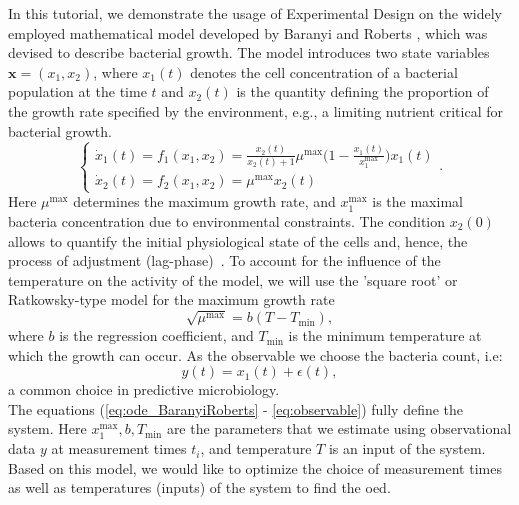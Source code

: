 \documentclass[10pt,A4paper]{article}
\newcommand{\mbx}{\mathbf{x}}
\begin{document}
In this tutorial, we demonstrate the usage of Experimental Design on the widely employed mathematical model developed by Baranyi and Roberts \cite{baranyiDynamicApproach1994}, which was devised to describe bacterial growth.
The model introduces two state variables $\mbx = (x_1, x_2)$, where $x_1(t)$ denotes the cell concentration of a bacterial population at the time $t$
and $x_2(t)$ is the quantity defining the proportion of the growth rate specified by the environment, e.g., a limiting nutrient critical for bacterial growth.
\begin{equation}
    \begin{cases}
        \dot x_1(t) = f_1(x_1, x_2) = \frac{x_2(t)}{x_2(t) + 1} \mu^\text{max} \big(1 - \frac{x_1(t)}{x_1^\text{max}}\big) x_1(t)\\
        \dot x_2(t) = f_2(x_1, x_2) = \mu^\text{max}  x_2(t)
    \end{cases}.
    \label{eq:ode_BaranyiRoberts}
\end{equation}
Here $\mu^\text{max}$ determines the maximum growth rate, and $x_1^\text{max}$ is the maximal bacteria concentration due to environmental constraints.
The condition $x_2(0)$ allows to quantify the initial physiological state of the cells and, hence, the process of adjustment (lag-phase)~\cite{grijspeerdt_estimating_1999}.
To account for the influence of the temperature on the activity of the model, we will use the 'square root' or Ratkowsky-type model for the maximum growth rate~\cite{ratkowsky_relationship_1982}
\begin{equation}
    \sqrt{\mu^\text{max}} = b (T - T_\text{min}),
    \label{eq:RatkowskyModel}
\end{equation}
where $b$ is the regression coefficient, and $T_\text{min}$ is the minimum temperature at which the growth can occur.
As the observable we choose the bacteria count, i.e:
\begin{equation}
    y(t) = x_1(t)+\epsilon(t),
    \label{eq:observable}
 \end{equation}
a common choice in predictive microbiology.\\
The equations (\ref{eq:ode_BaranyiRoberts} - \ref{eq:observable}) fully define the system.
Here $x_1^\text{max}, b, T_\text{min}$ are the parameters that we estimate using observational data $y$ at measurement times $t_i$, and temperature $T$ is an input of the system.
Based on this model, we would like to optimize the choice of measurement times as well as temperatures (inputs) of the system to find the \acl{oed}.
%
\end{document}
